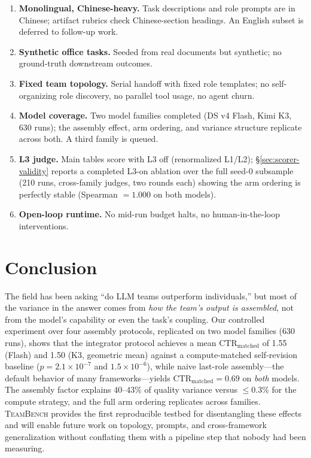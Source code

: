 \documentclass{article}
\newcommand{\teambench}{\textsc{TeamBench}}
\newcommand{\ctrm}{\mathrm{CTR}_{\text{matched}}}
\begin{document}
\begin{enumerate}
\item \textbf{Monolingual, Chinese-heavy.} Task descriptions and role prompts are in Chinese; artifact rubrics check Chinese-section headings. An English subset is deferred to follow-up work.
\item \textbf{Synthetic office tasks.} Seeded from real documents but synthetic; no ground-truth downstream outcomes.
\item \textbf{Fixed team topology.} Serial handoff with fixed role templates; no self-organizing role discovery, no parallel tool usage, no agent churn.
\item \textbf{Model coverage.} Two model families completed (DS v4 Flash, Kimi K3, 630 runs); the assembly effect, arm ordering, and variance structure replicate across both. A third family is queued.
\item \textbf{L3 judge.} Main tables score with L3 off (renormalized L1/L2); \S\ref{sec:scorer-validity} reports a completed L3-on ablation over the full seed-0 subsample (210 runs, cross-family judges, two rounds each) showing the arm ordering is perfectly stable (Spearman $= 1.000$ on both models).
\item \textbf{Open-loop runtime.} No mid-run budget halts, no human-in-the-loop interventions.
\end{enumerate}

\section{Conclusion}
\label{sec:conclusion}

The field has been asking ``do LLM teams outperform individuals,'' but most of the variance in the answer comes from \emph{how the team's output is assembled}, not from the model's capability or even the task's coupling. Our controlled experiment over four assembly protocols, replicated on two model families (630 runs), shows that the integrator protocol achieves a mean $\ctrm$ of 1.55 (Flash) and 1.50 (K3, geometric mean) against a compute-matched self-revision baseline ($p=2.1\times10^{-7}$ and $1.5\times10^{-6}$), while naive last-role assembly---the default behavior of many frameworks---yields $\ctrm = 0.69$ on \emph{both} models. The assembly factor explains 40--43\% of quality variance versus $\le$0.3\% for the compute strategy, and the full arm ordering replicates across families. \teambench{} provides the first reproducible testbed for disentangling these effects and will enable future work on topology, prompts, and cross-framework generalization without conflating them with a pipeline step that nobody had been measuring.
\end{document}

